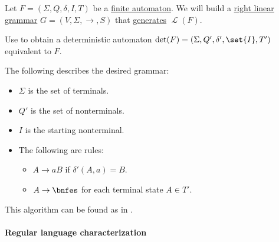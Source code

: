 \begin{algorithm}\label{alg:finite_automaton_to_right_linear_grammar}
  Let \( F = (\Sigma, Q, \delta, I, T) \) be a \hyperref[def:finite_automaton]{finite automaton}. We will build a \hyperref[def:chomsky_hierarchy/regular]{right linear grammar} \( G = (V, \Sigma, \to, S) \) that \hyperref[def:formal_grammar/language]{generates} \( \mscrL(F) \).

  \begin{thmenum}
     Use  to obtain a deterministic automaton \( \det(F) = (\Sigma, Q', \delta', \set{ I }, T') \) equivalent to \( F \).

     The following describes the desired grammar:
    \begin{itemize}
      \item \( \Sigma \) is the set of terminals.
      \item \( Q' \) is the set of nonterminals.
      \item \( I \) is the starting nonterminal.
      \item The following are rules:
      \begin{itemize}
        \item \( A \to aB \) if \( \delta'(A, a) = B \).
        \item \( A \to \bnfes \) for each terminal state \( A \in T' \).
      \end{itemize}
    \end{itemize}
  \end{thmenum}
\end{algorithm}
\begin{comments}
  \item This algorithm can be found as  in \cite{notebook:code}.
\end{comments}

\paragraph{Regular language characterization}

